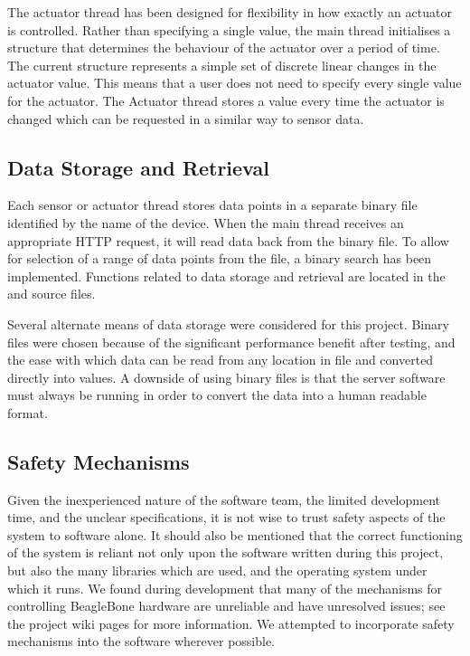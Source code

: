 The actuator thread has been designed for flexibility in how exactly an actuator is controlled. Rather than specifying a single value, the main thread initialises a structure that determines the behaviour of the actuator over a period of time. The current structure represents a simple set of discrete linear changes in the actuator value. This means that a user does not need to specify every single value for the actuator. The Actuator thread stores a value every time the actuator is changed which can be requested in a similar way to sensor data.



\subsection{Data Storage and Retrieval}

Each sensor or actuator thread stores data points in a separate binary file identified by the name of the device. When the main thread receives an appropriate HTTP request, it will read data back from the binary file. To allow for selection of a range of data points from the file, a binary search has been implemented. Functions related to data storage and retrieval are located in the  and  source files.

Several alternate means of data storage were considered for this project. Binary files were chosen because of the significant performance benefit after testing, and the ease with which data can be read from any location in file and converted directly into values. A downside of using binary files is that the server software must always be running in order to convert the data into a human readable format.



\subsection{Safety Mechanisms}

Given the inexperienced nature of the software team, the limited development time, and the unclear specifications, it is not wise to trust safety aspects of the system to software alone. It should also be mentioned that the correct functioning of the system is reliant not only upon the software written during this project, but also the many libraries which are used, and the operating system under which it runs. We found during development that many of the mechanisms for controlling BeagleBone hardware are unreliable and have unresolved issues; see the project wiki pages\cite{mctx3420_wiki} for more information. We attempted to incorporate safety mechanisms into the software wherever possible.

